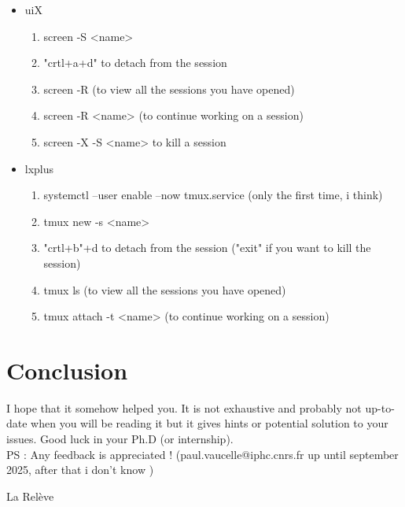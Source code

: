 \documentclass[reprint, a4paper, nofootinbib, amsmath, amssymb, aps]{revtex4-1}
\begin{document}
\begin{itemize}
    \item uiX \begin{enumerate}
        \item screen -S <name>
        \item  "crtl+a+d" to detach from the session
        \item screen -R (to view all the sessions you have opened)
        \item screen -R <name> (to continue working on a session)
        \item screen -X -S <name> to kill a session
    \end{enumerate}
    \item lxplus \begin{enumerate}
        \item systemctl --user enable --now tmux.service (only the first time, i think)
        \item tmux new -s <name>
        \item "crtl+b"+d to detach from the session ("exit" if you want to kill the session)
        \item tmux ls (to view all the sessions you have opened)
        \item tmux attach -t <name> (to continue working on a session)
    \end{enumerate}
\end{itemize}
\section{Conclusion}

I hope that it somehow helped you. It is not exhaustive and probably not up-to-date when you will be reading it but it gives hints or potential solution to your issues. Good luck in your Ph.D (or internship).\\
PS : Any feedback is appreciated ! (paul.vaucelle@iphc.cnrs.fr up until september 2025, after that i don't know )

La Relève 
\end{document}
